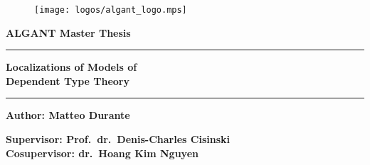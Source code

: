 \thispagestyle{empty}
\begin{titlepage}
  \begin{center}
    \begin{figure}[h!]
      \centering
      \texttt{[image: logos/algant\_logo.mps]}
    \end{figure}
    \vspace{0.4cm}
    \fontsize{15pt}{0.6cm}\selectfont
    {\textbf{ALGANT Master Thesis}}
    \vspace{0.2cm}
    \rule{\linewidth}{0.3mm}

    \vspace{0.05cm}
    \Huge{\textbf{Localizations of Models of
        \\ %
        Dependent Type Theory}}\\
    \vspace{0.05cm}

    \rule{\linewidth}{0.3mm}

    \vspace{1cm}

    \large{\textbf{Author: Matteo Durante}}\\
    \vspace{1cm}

    \large{\textbf{Supervisor: Prof.\ dr.\ Denis-Charles Cisinski}} \\
    \vspace{0.1cm}
    \large{\textbf{Cosupervisor: dr.\ Hoang Kim Nguyen}} \\

    \vfill


\end{center}
\end{titlepage}
